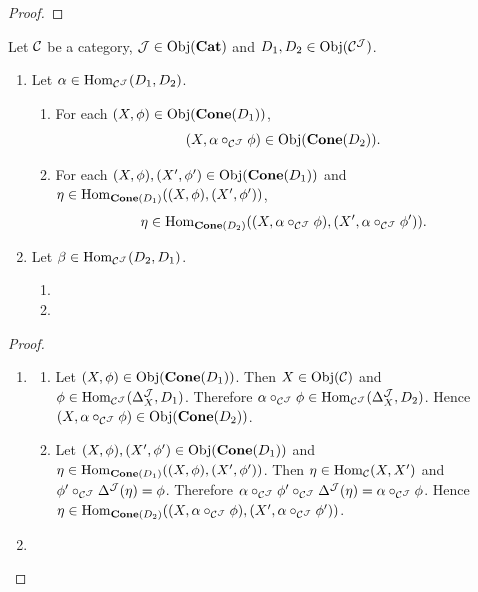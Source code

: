 \documentclass{book}
\begin{document}
	\begin{ex} 
	\end{ex}
	
	\begin{proof}
		
	\end{proof}
	
	
	\begin{ex} 
		Let $\MC$ be a category, $\MJ \in \Obj(\bCat)$ and $D_1, D_2 \in \Obj(\MC^{\MJ})$.
		\begin{enumerate}
			\item Let $\al \in \Hom_{\MC^{\MJ}}(D_1, D_2)$.
			\begin{enumerate}
				\item For each $(X, \phi) \in \Obj(\bCone(D_1))$, 
				$$(X, \al \circ_{\MC^{\MJ}} \phi) \in \Obj(\bCone(D_2)).$$
				\item For each $(X, \phi), (X', \phi') \in \Obj(\bCone(D_1))$ and $\eta \in \Hom_{\bCone(D_1)}((X, \phi), (X', \phi'))$, 
				$$\eta \in \Hom_{\bCone(D_2)}((X, \al \circ_{\MC^{\MJ}} \phi), (X', \al \circ_{\MC^{\MJ}} \phi')).$$
			\end{enumerate} 
			\item Let $\be \in \Hom_{\MC^{\MJ}}(D_2, D_1)$.
			\begin{enumerate}
				\item {}
				\item 
			\end{enumerate} 
		\end{enumerate}
	\end{ex}
	
	\begin{proof}\
		\begin{enumerate}
			\item 
			\begin{enumerate}
				\item Let $(X, \phi) \in \Obj(\bCone(D_1))$. Then $X \in \Obj(\MC)$ and $\phi \in \Hom_{\MC^{\MJ}}(\Del^{\MJ}_X, D_1)$. Therefore $\al \circ_{\MC^{\MJ}} \phi \in \Hom_{\MC^{\MJ}}(\Del^{\MJ}_X, D_2)$. Hence $(X, \al \circ_{\MC^{\MJ}} \phi) \in \Obj(\bCone(D_2))$. 
				\item Let $(X, \phi), (X', \phi') \in \Obj(\bCone(D_1))$ and $\eta \in \Hom_{\bCone(D_1)}((X, \phi), (X', \phi'))$. Then $\eta \in \Hom_{\MC}(X, X')$ and $\phi' \circ_{\MC^{\MJ}} \Del^{\MJ}(\eta) = \phi$. Therefore $\al \circ_{\MC^{\MJ}} \phi' \circ_{\MC^{\MJ}} \Del^{\MJ}(\eta) = \al \circ_{\MC^{\MJ}} \phi$. Hence $\eta \in \Hom_{\bCone(D_2)}((X, \al \circ_{\MC^{\MJ}} \phi), (X', \al \circ_{\MC^{\MJ}} \phi'))$.
			\end{enumerate}
			\item {}
		\end{enumerate}
	\end{proof}
	
\end{document}
